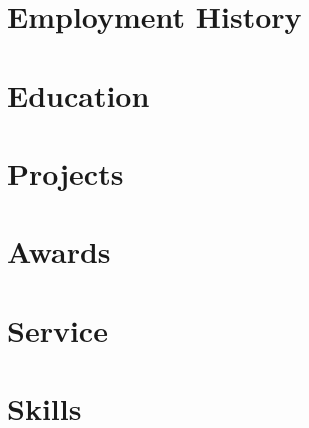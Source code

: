 \documentclass[9pt]{resume}
\begin{document}
\maketitle

\section{Employment History}



















\section{Education}






\section{Projects}



















\section{Awards}





\section{Service}



\section{Skills}











\end{document}
